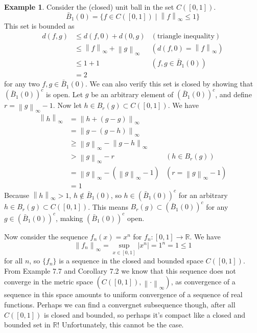 \documentclass{article}
\newcommand{\R}{\mathbb{R}}
\newcommand{\norm}[1]{\left\lVert#1\right\rVert}
\newcommand{\abs}[1]{\left\lvert#1\right\rvert}
\theoremstyle{definition}
\newtheorem{example}{Example}[section]
\begin{document}
	\begin{example}
		Consider the (closed) unit ball in the set $C([0,1])$. 
		$$ \bar B_1(0)=\{f\in C([0,1]) \mid \norm{f}_\infty \le 1 \}$$
		This set is bounded as 
		\begin{align*}
			d(f,g) & \le d(f,0) + d(0,g) & (\text{triangle inequality})\\
			& \le \norm{f}_\infty + \norm{g}_\infty  & (d(f,0) = \norm{f}_\infty)\\
			& \le 1 + 1 & (f,g\in  \bar B_1(0))\\
			& = 2
		\end{align*}
	for any two $f,g \in  \bar B_1(0)$. We can also verify this set is closed by showing that $(\bar B_1(0))^c$ is open. Let $g$  be an arbitrary element of $(\bar B_1(0))^c$, and define $r = \norm{g}_\infty - 1$. Now let $h \in B_r(g)\subset C([0,1])$. We have 
	\begin{align*}
		\norm{h}_\infty & = \norm{h + (g-g)}_\infty\\
		& = \norm{g - (g-h)}_\infty\\
		& \ge \norm{g}_\infty - \norm{g-h}_\infty\\
		& > \norm{g}_\infty - r & (h \in B_r(g))\\
		& = \norm{g}_\infty - (\norm{g}_\infty - 1) & (r = \norm{g}_\infty - 1)\\
		& = 1
	\end{align*}
	Because $\norm{h}_\infty > 1$, $h\notin \bar B_1(0)$, so $h\in (\bar B_1(0))^c$ for an arbitrary $h \in B_r(g)\subset C([0,1])$. This means $B_r(g)\subset (\bar B_1(0))^c$ for any $g\in (\bar B_1(0))^c$, making $ (\bar B_1(0))^c $ open.
	
	Now consider the sequence $f_n(x)=x^n$ for $f_n:[0,1]\to \R$. We have 
	$$ \norm{f_n}_\infty = \sup_{x\in[0,1]}\abs{x^n} = 1^n = 1 \le 1$$ for all $n$, so $\{f_n\}$ is a sequence in the closed and bounded space $C([0,1])$.  From Example 7.7 and Corollary 7.2 we know that this sequence does not converge in the metric space $(C([0,1]), \norm{\cdot}_\infty)$, as convergence of a sequence in this space amounts to uniform convergence of a sequence of real functions. Perhaps we can find a convergnet subsequence though, after all $C([0,1])$ is closed and bounded, so perhaps it's compact like a closed and bounded set in $\R$! Unfortunately, this cannot be the case. 
	

\end{example}
\end{document}
